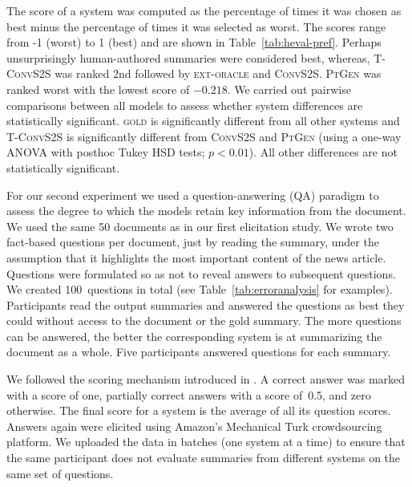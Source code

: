 \documentclass[11pt,a4paper]{article}
\begin{document}
The score of a system was computed as the percentage of times it was
chosen as best minus the percentage of times it was selected as
worst. The scores range from -1 (worst) to 1 (best) and are shown in
Table~\ref{tab:heval-pref}. Perhaps unsurprisingly human-authored
summaries were considered best, whereas, \textsc{T-ConvS2S} was ranked
2nd followed by \textsc{ext-oracle} and
\textsc{ConvS2S}. \textsc{PtGen} was ranked worst with the lowest
score of $-0.218$. We carried out pairwise comparisons between all
models to assess whether system differences are statistically
significant. \textsc{gold} is significantly different from all other
systems and \textsc{T-ConvS2S} is significantly different from
\textsc{ConvS2S} and \textsc{PtGen} (using a one-way ANOVA with
posthoc Tukey HSD tests; $p < 0.01$). All other differences are not
statistically significant.








For our second experiment we used a question-answering (QA) paradigm
\cite{Clarke:Lapata:2010,narayan-rank18} to assess the degree to which
the models retain key information from the document. We used the same
50 documents as in our first elicitation study.  We wrote two
fact-based questions per document, just by reading the summary, under
the assumption that it highlights the most important content of the
news article. Questions were formulated so as not to reveal answers to
subsequent questions.  We created 100~questions in total (see
Table~\ref{tab:erroranalysis} for examples). Participants read the
output summaries and answered the questions as best they could without
access to the document or the gold summary. The more questions can be
answered, the better the corresponding system is at summarizing the
document as a whole.  Five participants answered questions for each
summary.

We followed the scoring mechanism introduced in
. A correct answer was marked with a score
of one, partially correct answers with a score of~0.5, and zero
otherwise. The final score for a system is the average of all its
question scores. Answers again were elicited using Amazon's Mechanical
Turk crowdsourcing platform. We uploaded the data in batches (one
system at a time) to ensure that the same participant does not
evaluate summaries from different systems on the same set of
questions.
\end{document}

